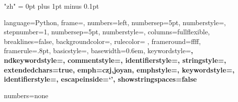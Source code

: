 \XeTeXlinebreaklocale "zh" %
\XeTeXlinebreakskip = 0pt plus 1pt minus 0.1pt %




\usepackage{listings} %



\lstset %
{language=Python,
frame=\leftline\shadowbox,
numbers=left,
numbersep=5pt,
numberstyle=\ttfamily\footnotesize\color{gray},
stepnumber=1,
numbersep=5pt,
numberstyle=\color[RGB]{80,192,192},
columns=fullflexible,
breaklines=false,  %
backgroundcolor=\color{black!10!white},
rulecolor= \color{gray},
frameround=ffff,
framerule=.8pt,  %
basicstyle=\linespread{1.1}\ttfamily\footnotesize, %
basewidth=0.6em,
keywordstyle=\ttfamily\bf\color{colorKeyword},
ndkeywordstyle=\ttfamily\bf\color{colorNdkeyword},
commentstyle=\color{colorComment},
identifierstyle=\ttfamily\color{colorIdentifier}\bfseries,
stringstyle=\color{colorString}\ttfamily,
extendedchars=true,
emph={czj,joyan},
emphstyle=\color{blue}\bfseries,
keywordstyle=\color{blue}\bfseries,
identifierstyle=\color{black}, %
escapeinside=`',
showstringspaces=false
}



 {numbers=none}

